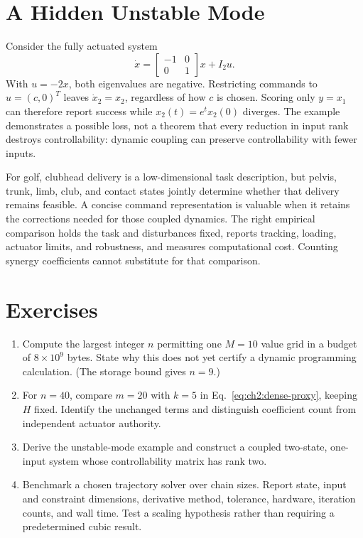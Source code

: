 \section{A Hidden Unstable Mode}

Consider the fully actuated system
\begin{equation}
 \dot x=\begin{bmatrix}-1&0\\0&1\end{bmatrix}x+I_2u.
\end{equation}
With $u=-2x$, both eigenvalues are negative. Restricting commands to
$u=(c,0)^T$ leaves $\dot x_2=x_2$, regardless of how $c$ is chosen. Scoring
only $y=x_1$ can therefore report success while $x_2(t)=e^t x_2(0)$ diverges.
The example demonstrates a possible loss, not a theorem that every reduction
in input rank destroys controllability: dynamic coupling can preserve
controllability with fewer inputs.

For golf, clubhead delivery is a low-dimensional task description, but pelvis,
trunk, limb, club, and contact states jointly determine whether that delivery
remains feasible. A concise command representation is valuable when it retains
the corrections needed for those coupled dynamics. The right empirical
comparison holds the task and disturbances fixed, reports tracking, loading,
actuator limits, and robustness, and measures computational cost. Counting
synergy coefficients cannot substitute for that comparison.

\section*{Exercises}
\begin{enumerate}
 \item Compute the largest integer $n$ permitting one $M=10$ value grid in
 a budget of $8\times10^9$ bytes. State why this does not yet certify a dynamic
 programming calculation. (The storage bound gives $n=9$.)
 \item For $n=40$, compare $m=20$ with $k=5$ in
 Eq.~\eqref{eq:ch2:dense-proxy}, keeping $H$ fixed. Identify the unchanged terms
 and distinguish coefficient count from independent actuator authority.
 \item Derive the unstable-mode example and construct a coupled two-state,
 one-input system whose controllability matrix has rank two.
 \item Benchmark a chosen trajectory solver over chain sizes. Report state,
 input and constraint dimensions, derivative method, tolerance, hardware,
 iteration counts, and wall time. Test a scaling hypothesis rather than
 requiring a predetermined cubic result.
\end{enumerate}
